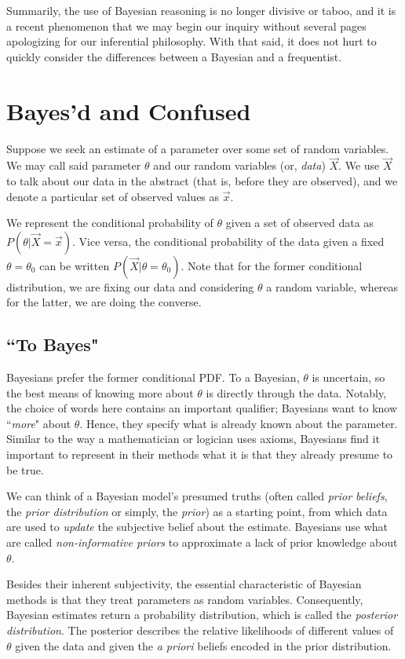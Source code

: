 \documentclass[12pt,twoside]{reedthesis}
\begin{document}
	Summarily, the use of Bayesian reasoning is no longer divisive or taboo, and it is a recent phenomenon that we may begin our inquiry without several pages apologizing for our inferential philosophy. With that said, it does not hurt to quickly consider the differences between a Bayesian and a frequentist. 
		
\section{Bayes'd and Confused}

	Suppose we seek an estimate of a parameter over some set of random variables. We may call said parameter $\theta$ and our random variables (or, {\em data}) $\vec{X}$. We use $\vec{X}$ to talk about our data in the abstract (that is, before they are observed), and we denote a particular set of observed values as $\vec{x}$. 

	We represent the conditional probability of $\theta$ given a set of observed data as $P(\theta | \vec{X} = \vec{x})$. Vice versa, the conditional probability of the data given a fixed $\theta = \theta_0$ can be written $P(\vec{X} | \theta = \theta_0)$. Note that for the former conditional distribution, we are fixing our data and considering $\theta$ a random variable, whereas for the latter, we are doing the converse.

	\subsection*{``To Bayes"}
	Bayesians prefer the former conditional PDF. To a Bayesian, $\theta$ is uncertain, so the best means of knowing more about $\theta$ is directly through the data. Notably, the choice of words here contains an important qualifier; Bayesians want to know ``{\em more}" about $\theta$. Hence, they specify what is already known about the parameter. Similar to the way a mathematician or logician uses axioms, Bayesians find it important to represent in their methods what it is that they already presume to be true.
	
	We can think of a Bayesian model's presumed truths (often called {\em prior beliefs}, the {\em prior distribution} or simply, the {\em prior}) as a starting point, from which data are used to {\em update} the subjective belief about the estimate.  Bayesians use what are called {\em non-informative priors} to approximate a lack of prior knowledge about $\theta$. 
	
	Besides their inherent subjectivity, the essential characteristic of Bayesian methods is that they treat parameters as random variables. Consequently, Bayesian estimates return a probability distribution, which is called the {\em posterior distribution}. The posterior describes the relative likelihoods of different values of $\theta$ given the data and given the {\em a priori} beliefs encoded in the prior distribution.
\end{document}
